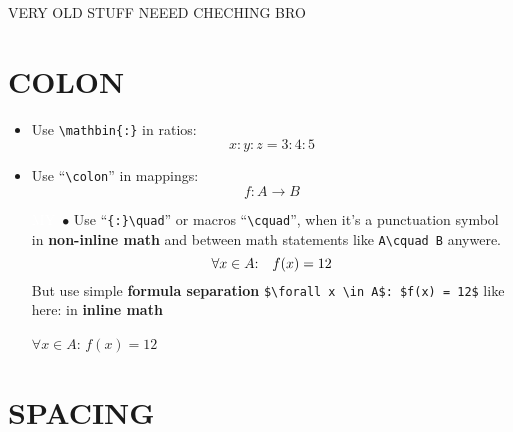 \documentclass[a5paper,openany,9pt]{extbook}
\begin{document}
\newpage

VERY OLD STUFF NEEED CHECHING BRO
\section{COLON}

\begin{itemize}
\item
Use \verb|\mathbin{:}| in ratios:
$$x\mathbin{:}y\mathbin{:}z = 3\mathbin{:}4\mathbin{:}5$$

\item
Use ``\verb=\colon='' in mappings:
$$f\colon A \to B$$

\item[\colorbox{prpl}{\textcolor{white}{MY}}\ $\bullet$]
Use ``\verb={:}\quad='' or macros ``\verb=\cquad='', when it's a punctuation symbol in \textbf{non-inline math} and between math statements like \verb|A\cquad B| anywere.
$$\forall x \in A{:}\quad f(x) = 12$$
But use simple \textbf{formula separation} \verb|$\forall x \in A$: $f(x) = 12$| like here: in \textbf{inline math}
\begin{center}
$\forall x \in A$: $f(x) = 12$
\end{center}


\end{itemize}
	
\section{SPACING}
\end{document}
